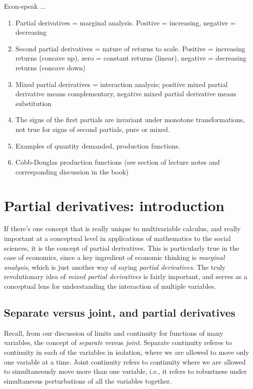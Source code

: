 \documentclass[10pt]{amsart}
\begin{document}
Econ-speak ...

\begin{enumerate}
\item Partial derivatives = marginal analysis. Positive = increasing,
  negative = decreasing
\item Second partial derivatives = nature of returns to
  scale. Positive = increasing returns (concave up), zero = constant
  returns (linear), negative = decreasing returns (concave down)
\item Mixed partial derivatives = interaction analysis; positive mixed
  partial derivative means complementary, negative mixed partial
  derivative means substitution
\item The signs of the first partials are invariant under monotone
  transformations, not true for signs of second partials, pure or
  mixed.
\item Examples of quantity demanded, production functions.
\item Cobb-Douglas production functions (see section of lecture notes
  and corresponding discussion in the book)
\end{enumerate}
\section{Partial derivatives: introduction}

If there's one concept that is really unique to multivariable
calculus, and really important at a conceptual level in applications
of mathematics to the social sciences, it is the concept of partial
derivatives. This is particularly true in the case of economics, since
a key ingredient of economic thinking is {\em marginal analysis},
which is just another way of saying {\em partial derivatives}. The
truly revolutionary idea of {\em mixed partial derivatives} is fairly
important, and serves as a conceptual lens for understanding the
interaction of multiple variables.

\subsection{Separate versus joint, and partial derivatives}

Recall, from our discussion of limits and continuity for functions of
many variables, the concept of {\em separate} versus {\em
joint}. Separate continuity referes to continuity in each of the
variables in isolation, where we are allowed to move only one variable
at a time. Joint continuity refers to continuity where we are allowed
to simultaneously move more than one variable, i.e., it refers to
robustness under simultaneous perturbations of all the variables
together.
\end{document}
